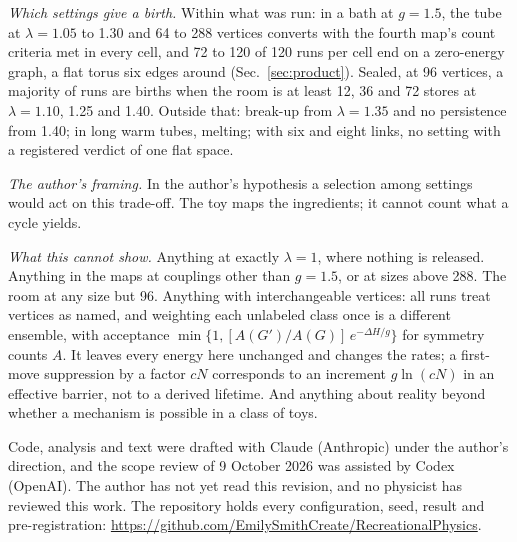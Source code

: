 \documentclass[aps,pre,10pt,twocolumn,superscriptaddress,nofootinbib]{revtex4-2}
\begin{document}
\emph{Which settings give a birth.} Within what was run: in a bath at $g=1.5$, the tube at $\lambda=1.05$ to 1.30
and 64 to 288 vertices converts with the fourth map's count criteria met in every cell, and 72 to 120 of 120 runs
per cell end on a zero-energy graph, a flat torus six edges around (Sec.~\ref{sec:product}). Sealed, at 96 vertices, a majority of runs are births when the room is at
least 12, 36 and 72 stores at $\lambda=1.10$, 1.25 and 1.40. Outside that: break-up from $\lambda=1.35$ and no persistence from 1.40; in long warm tubes, melting;
with six and eight links, no setting with a registered verdict of one flat space.

\emph{The author's framing.} In the author's hypothesis a selection among settings would act on this trade-off.
The toy maps the ingredients; it cannot count what a cycle yields.

\emph{What this cannot show.} Anything at exactly $\lambda=1$, where nothing is released. Anything in the maps at
couplings other than $g=1.5$, or at sizes above 288. The room at any size but 96.
Anything with interchangeable vertices: all runs treat vertices as named, and weighting each unlabeled class
once is a different ensemble, with acceptance $\min\{1,[A(G')/A(G)]\,e^{-\Delta H/g}\}$ for symmetry counts $A$.
It leaves every energy here unchanged and changes the rates; a first-move suppression by a factor $cN$
corresponds to an increment $g\ln(cN)$ in an effective barrier, not to a derived lifetime. And anything about
reality beyond whether a mechanism is possible in a class of toys.

\begin{acknowledgments}
Code, analysis and text were drafted with Claude (Anthropic) under the author's direction, and the scope review
of 9 October 2026 was assisted by Codex (OpenAI). The author has not yet read this revision, and no physicist has
reviewed this work. The repository holds
every configuration, seed, result and pre-registration:
\url{https://github.com/EmilySmithCreate/RecreationalPhysics}.
\end{acknowledgments}
\end{document}
